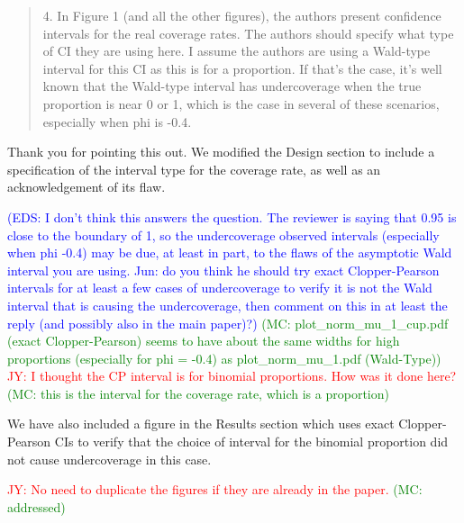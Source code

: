 \documentclass[12pt]{article}
\newcommand{\jy}[1]{\textcolor{red}{JY: #1}}
\newcommand{\eds}[1]{\textcolor{blue}{(EDS: #1)}}
\newcommand{\mc}[1]{\textcolor{green}{(MC: #1)}}
\newenvironment{comment}%
{\begin{quotation}\noindent\small\it\color{darkblue}\ignorespaces%
}{\end{quotation}}
\begin{document}
\begin{comment}
4.  In Figure 1 (and all the other figures), the authors present confidence 
intervals for the real coverage rates.  The authors should specify what type of 
CI they are using here.  I assume the authors are using a Wald-type interval for 
this CI as this is for a proportion.  If that’s the case, it’s well known that 
the Wald-type interval has undercoverage when the true proportion is near 0 or 
1, which is the case in several of these scenarios, especially when phi is -0.4. 
\end{comment}

Thank you for pointing this out. We modified the Design section to include a 
specification of the interval type for the coverage rate, as well as an 
acknowledgement of its flaw.

\eds{I don't think this answers the question.  The reviewer is saying that 0.95 
is close to the boundary of 1, so the undercoverage observed intervals
(especially when phi -0.4) may be due, at least in part, to the flaws 
of the asymptotic Wald interval you are using. 
\@ Jun: do you think he should try exact Clopper-Pearson
intervals for at least a few cases of undercoverage to verify it is not the Wald
interval that is causing the undercoverage, then comment on this in at least the
reply (and possibly also in the main paper)?}
\mc{plot\_norm\_mu\_1\_cup.pdf (exact Clopper-Pearson) seems to have about the same 
widths for high 
proportions
(especially for phi = -0.4) as {plot\_norm\_mu\_1.pdf} (Wald-Type)}
\jy{I thought the CP interval is for binomial proportions. How was it
  done here?}
\mc{this is the interval for the coverage rate, which is a proportion}


We have also included a figure in the Results section which 
uses exact 
Clopper-Pearson CIs to verify that the choice of interval
for the binomial proportion did not cause undercoverage in this case.




\jy{No  need to duplicate the figures if they are already in the paper.}
\mc{addressed}
\end{document}
